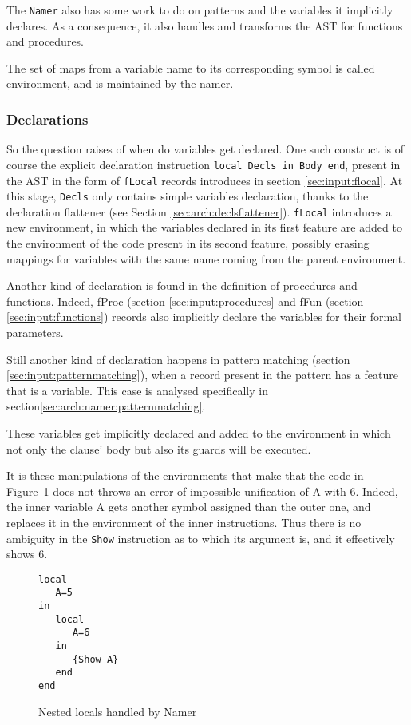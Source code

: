 \documentclass[a4paper]{memoir}
\begin{document}
The \lstinline!Namer! also has some work to do on patterns and the variables it
implicitly declares. As a consequence, it also handles and transforms the AST
for functions and procedures.

The set of maps from a variable name to its corresponding symbol is called environment, and is maintained by the namer.


\subsubsection{Declarations}
So the question raises of when do variables get declared.
One such construct is of course the explicit declaration instruction \lstinline!local Decls in Body end!, present in the AST in the form of \lstinline!fLocal! records introduces in section \ref{sec:input:flocal}. At this stage, \lstinline!Decls! only contains simple variables declaration, thanks to the declaration flattener (see Section \ref{sec:arch:declsflattener}). \lstinline!fLocal! introduces a new environment, in which the variables declared in its first feature are added to the environment of the code present in its second feature, possibly erasing mappings for variables with the same name coming from the parent environment. 

Another kind of declaration is found in the definition of procedures and functions. Indeed, fProc (section \ref{sec:input:procedures} and fFun (section \ref{sec:input:functions}) records also implicitly declare the variables for their formal parameters. %

Still another kind of declaration happens in pattern matching (section \ref{sec:input:patternmatching}), when a record present in the pattern has a feature that is a variable. This case is analysed specifically in section\ref{sec:arch:namer:patternmatching}.

These variables get implicitly declared and added to the environment in which not only the clause' body but also its guards will be executed.


It is these manipulations of the environments that make that the code in Figure~\ref{fig:namer_nested_locals} does not throws an error of impossible unification of A with 6. Indeed, the inner variable A gets another symbol assigned than the outer one, and replaces it in the environment of the inner instructions. Thus there is no ambiguity in the \lstinline!Show! instruction as to which its argument is, and it effectively shows 6.
\begin{figure}
\begin{lstlisting}
local
   A=5
in
   local 
      A=6
   in
      {Show A}
   end
end
\end{lstlisting}
\caption{Nested locals handled by Namer}
\label{fig:namer_nested_locals}
\end{figure}
\end{document}
